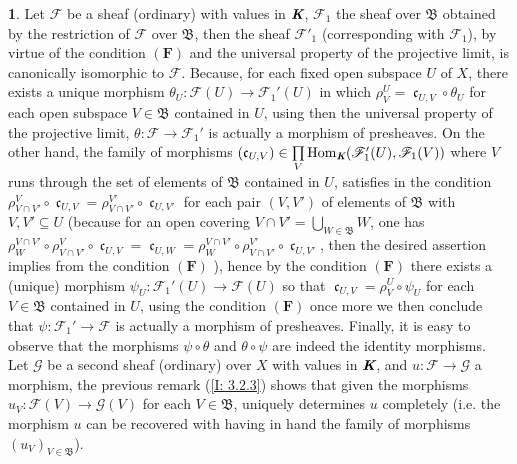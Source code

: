 \documentclass[12pt]{amsart}
\newcommand{\Hom}{\operatorname{Hom}}
\newcommand{\can}{\operatorname{\mathfrak{c}}}
\theoremstyle{definition}
\newtheorem{bk}[proposition]{}
\begin{document}
\begin{bk}\label{I: 3.2.5} Let $\mathscr{F}$ be a sheaf (ordinary) with values in $\emph{\textbf{K}}$, $\mathscr{F}_{1}$ the sheaf over $\mathfrak{B}$ obtained by the restriction of $\mathscr{F}$ over $\mathfrak{B}$, then the sheaf  $\mathscr{F}'_{1}$ (corresponding with $\mathscr{F}_{1}$), by virtue of the condition $(\textbf{F})$ and the universal property of the projective limit, is canonically isomorphic to $\mathscr{F}$. Because, for each fixed open subspace $U$ of $X$, there exists a unique morphism $\theta_{U}:\mathscr{F}(U)\rightarrow\mathscr{F}_{1}'(U)$ in which  $\rho_{V}^{U}=\can_{U, V}\circ\theta_{U}$ for each open subspace $V\in\mathfrak{B}$ contained in $U$, using then the universal property of the projective limit, $\theta:\mathscr{F}\rightarrow\mathscr{F}_{1}'$ is actually a morphism of presheaves. On the other hand, the family of morphisms $(\can_{U, V})\in\prod\limits_{V}
\Hom_{\emph{\textbf{K}}}(\mathscr{F}_{1}'(U), \mathscr{F}_{1}(V))$ where $V$ runs through the set of elements of $\mathfrak{B}$ contained in $U$, satisfies in the condition $\rho_{V\cap V'}^{V}\circ\can_{U,V}=\rho_{V\cap V'}^{V'}\circ\can_{U,V'}$ for each pair $(V, V')$ of elements of $\mathfrak{B}$ with $V, V'\subseteq U$ (because for an open covering $V\cap V'=\bigcup\limits_{W\in\mathfrak{B}}W$, one has $\rho_{W}^{V\cap V'}\circ\rho_{V\cap V'}^{V}\circ\can_{U,V}=\can_{U,W}=\rho_{W}^{V\cap V'}\circ\rho_{V\cap V'}^{V'}\circ\can_{U,V'}$, then the desired assertion implies from the condition $(\textbf{F})$ ), hence by the condition $(\textbf{F})$ there exists a (unique) morphism $\psi_{U}:\mathscr{F}_{1}'(U)\rightarrow\mathscr{F}(U)$ so that $\can_{U,V}=\rho_{V}^{U}\circ\psi_{U}$ for each $V\in\mathfrak{B}$ contained in $U$,  using the condition $(\textbf{F})$ once more we then conclude that $\psi:\mathscr{F}_{1}'\rightarrow\mathscr{F}$ is actually a morphism of presheaves. Finally, it is easy to observe that the morphisms $\psi\circ\theta$ and $\theta\circ\psi$ are indeed the identity morphisms.\\
Let $\mathscr{G}$ be a second sheaf (ordinary) over $X$ with values in $\emph{\textbf{K}}$, and $u:\mathscr{F}\rightarrow\mathscr{G}$ a morphism, the previous remark (\ref{I: 3.2.3}) shows that given the morphisms $u_{V}:\mathscr{F}(V)\rightarrow\mathscr{G}(V)$ for each $V\in\mathfrak{B}$, uniquely determines $u$ completely (i.e. the morphism $u$ can be recovered with having in hand the family of morphisms $(u_{V})_{V\in\mathfrak{B}}$). \\
\end{bk}
\end{document}
